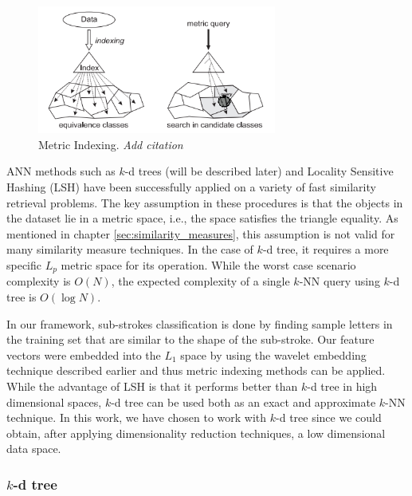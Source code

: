 \begin{figure}
\centering
\includegraphics[width=0.7\textwidth]{./figures/indexing}       
\caption{Metric Indexing. \emph{Add citation}}
\label{fig:indexing}
\end{figure}


\iftoggle{edit-mode}{\hspace{0pt}\marginpar{Examples of Exact and Approximate Indexing}}{}
ANN methods such as $k$-d trees (will be described later) and Locality Sensitive Hashing (LSH) \cite{gionis1999similarity} have been successfully applied on a variety of fast similarity retrieval problems. The key assumption in these procedures is that the objects in the dataset lie in a metric space, i.e., the space satisfies the triangle equality. As mentioned in chapter \ref{sec:similarity_measures}, this assumption is not valid for many similarity measure techniques. In the case of $k$-d tree, it requires a more specific $L_p$ metric space for its operation. While the worst case scenario complexity is $O(N)$, the expected complexity of a single $k$-NN query using $k$-d tree is $O(\log N)$.

\iftoggle{edit-mode}{\hspace{0pt}\marginpar{This work}}{}
In our framework, sub-strokes classification is done by finding sample letters in the training set that are similar to the shape of the sub-stroke. Our feature vectors were embedded into the $L_1$ space by using the wavelet embedding technique described earlier and thus metric indexing methods can be applied. While the advantage of LSH is that it performs better than $k$-d tree in high dimensional spaces, $k$-d tree can be used both as an exact and approximate $k$-NN technique. In this work, we have chosen to work with $k$-d tree since we could obtain, after applying dimensionality reduction techniques, a low dimensional data space.

\subsubsection{$k$-d tree}
\label{subsubsec:kd_tree}

